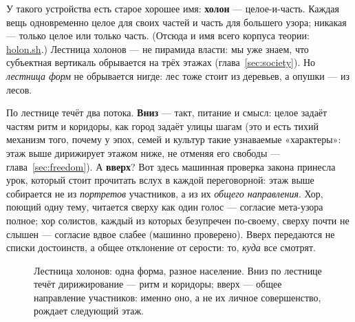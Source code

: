 \documentclass[11pt,letterpaper]{article}
\newcommand{\holonsh}{\href{https://holon.sh}{holon.sh}\xspace}
\newcommand{\voiceroseneutral}[4]{%
  \foreach \vang in {90,141.4,192.8,244.3,295.7,347.1,38.6}{%
    \draw[plosgray!40] (#1,#2) -- ($(#1,#2)+(\vang:#3)$);
    \fill[plosblue!65] ($(#1,#2)+(\vang:#3)$) circle (#4);}}
\begin{document}
У такого устройства есть старое хорошее имя: \textbf{холон} ---
целое-и-часть. Каждая вещь одновременно целое для своих частей и
часть для большего узора; никакая --- только целое или только часть.
(Отсюда и имя всего корпуса теории: \holonsh.) Лестница холонов ---
не пирамида власти: мы уже знаем, что субъектная вертикаль обрывается
на трёх этажах (глава~\ref{sec:society}). Но \emph{лестница форм} не
обрывается нигде: лес тоже стоит из деревьев, а опушки --- из лесов.

По лестнице течёт два потока. \textbf{Вниз} --- такт, питание и
смысл: целое задаёт частям ритм и коридоры, как город задаёт улицы
шагам (это и есть тихий механизм того, почему у эпох, семей и
культур такие узнаваемые «характеры»: этаж выше дирижирует этажом
ниже, не отменяя его свободы --- глава~\ref{sec:freedom}). А
\textbf{вверх}? Вот здесь машинная проверка закона принесла урок,
который стоит прочитать вслух в каждой переговорной: этаж выше собирается
не из \emph{портретов} участников, а из их \emph{общего направления}.
Хор, поющий одну тему, читается сверху как один голос --- согласие
мета-узора полное; хор солистов, каждый из которых безупречен
по-своему, сверху почти не слышен --- согласие вдвое слабее
(машинно проверено). Вверх передаются не списки достоинств, а общее
отклонение от серости: то, \emph{куда} все смотрят.

\begin{figure}[H]
\centering
{}
\caption{Лестница холонов: одна форма, разное население. Вниз по
лестнице течёт дирижирование --- ритм и коридоры; вверх --- общее
направление участников: именно оно, а не их личное совершенство,
рождает следующий этаж.}
\label{fig:holarchy}
\end{figure}
\end{document}
